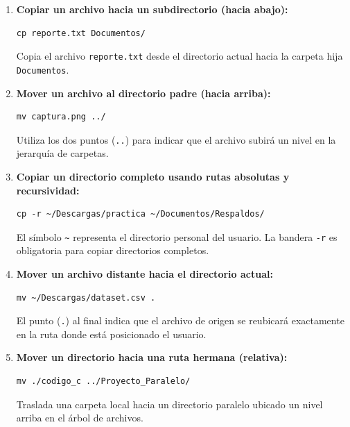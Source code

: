 \begin{enumerate}[leftmargin=*]
    \item \textbf{Copiar un archivo hacia un subdirectorio (hacia abajo):}
\begin{lstlisting}
cp reporte.txt Documentos/
\end{lstlisting}
    Copia el archivo \texttt{reporte.txt} desde el directorio actual hacia la carpeta hija \texttt{Documentos}.

    \item \textbf{Mover un archivo al directorio padre (hacia arriba):}
\begin{lstlisting}
mv captura.png ../
\end{lstlisting}
    Utiliza los dos puntos (\texttt{..}) para indicar que el archivo subirá un nivel en la jerarquía de carpetas.

    \item \textbf{Copiar un directorio completo usando rutas absolutas y recursividad:}
\begin{lstlisting}
cp -r ~/Descargas/practica ~/Documentos/Respaldos/
\end{lstlisting}
    El símbolo \texttt{\~{}} representa el directorio personal del usuario. La bandera \texttt{-r} es obligatoria para copiar directorios completos.

    \item \textbf{Mover un archivo distante hacia el directorio actual:}
\begin{lstlisting}
mv ~/Descargas/dataset.csv .
\end{lstlisting}
    El punto (\texttt{.}) al final indica que el archivo de origen se reubicará exactamente en la ruta donde está posicionado el usuario.

    \item \textbf{Mover un directorio hacia una ruta hermana (relativa):}
\begin{lstlisting}
mv ./codigo_c ../Proyecto_Paralelo/
\end{lstlisting}
    Traslada una carpeta local hacia un directorio paralelo ubicado un nivel arriba en el árbol de archivos.
\end{enumerate}



